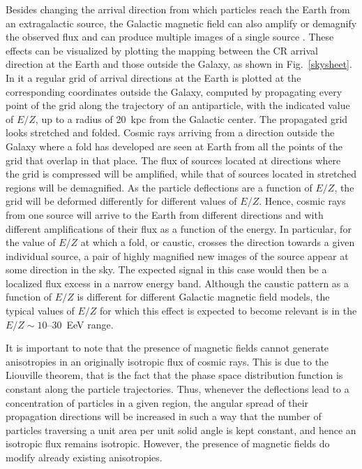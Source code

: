 \documentclass[twoside,12pt]{article}
\begin{document}
Besides changing the arrival direction from which particles reach the Earth from an extragalactic source, the Galactic magnetic field can  also amplify or demagnify the observed flux and can produce multiple images of a single source \cite{hmr99}. These effects can be visualized by plotting the mapping between the CR arrival direction at the Earth and those outside the Galaxy, as shown in Fig.~\ref{skysheet}. In it a regular grid of arrival directions at the Earth is  plotted at the corresponding coordinates outside the Galaxy, computed by propagating every point of the grid along the trajectory of an antiparticle, with the indicated value of $E/Z$, up to a radius of 20~kpc from the Galactic center. The propagated grid looks stretched and folded.  Cosmic rays arriving from a direction outside the Galaxy where a fold has developed are seen at Earth from all the points of the grid that overlap in that place. The flux of sources located at directions where the grid is compressed will be amplified, while that of sources located in stretched regions will be demagnified. As the particle deflections are a function of $E/Z$, the grid will be deformed differently for different values of $E/Z$. Hence, cosmic rays from one source will arrive to the Earth from different directions and with different amplifications of their flux as a function of the energy. In particular,  for the value of $E/Z$ at which a fold, or caustic, crosses the direction towards a given individual source, a pair of highly magnified new images of the source appear at some direction in the sky. The expected signal in this case would then be a localized flux excess in a narrow energy band. Although the caustic pattern as a function of $E/Z$ is different for different Galactic magnetic field models, the typical values of $E/Z$ for which this effect is expected to become relevant is in the $E/Z \sim 10$--30~EeV range. 


It is important to note that the presence of magnetic fields cannot generate anisotropies in an originally isotropic flux of cosmic rays. This is due to the Liouville theorem, that is the fact that the phase space distribution function is constant along the particle trajectories. Thus, whenever the deflections lead to a concentration of particles in a given region, the angular spread of their propagation directions will be increased in such a way that the number of particles traversing a unit area per unit solid angle is kept constant, and hence an isotropic flux remains isotropic.
However, the presence of magnetic fields do modify already existing anisotropies.
\end{document}
